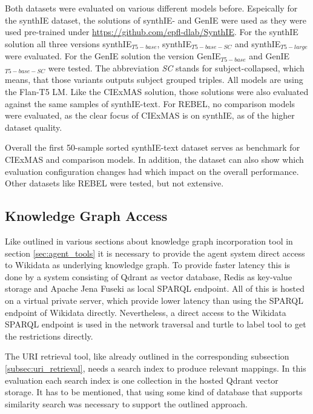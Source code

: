 \documentclass[a4paper,oneside,bibliography=totoc]{scrbook}
\begin{document}
Both datasets were evaluated on various different models before. Espeically for the synthIE dataset, the solutions of \citet{Josifoski2023} synthIE- and GenIE were used as they were used pre-trained under \url{https://github.com/epfl-dlab/SynthIE}. For the synthIE solution all three versions synthIE$_{T5-base}$, synthIE$_{T5-base-SC}$ and synthIE$_{T5-large}$ were evaluated. For the GenIE solution the version GenIE$_{T5-base}$ and GenIE$_{T5-base-SC}$ were tested. The abbreviation \textit{SC} stands for subject-collapsed, which means, that those variants outputs subject grouped triples. All models are using the Flan-T5 \ac{LM}. Like the CIExMAS solution, those solutions were also evaluated against the same samples of synthIE-text. For REBEL, no comparison models were evaluated, as the clear focus of CIExMAS is on synthIE, as of the higher dataset quality.

Overall the first 50-sample sorted synthIE-text dataset serves as benchmark for CIExMAS and comparison models. In addition, the dataset can also show which evaluation configuration changes had which impact on the overall performance. Other datasets like REBEL were tested, but not extensive.

\subsection{Knowledge Graph Access}

Like outlined in various sections about knowledge graph incorporation tool in section \ref{sec:agent_tools} it is necessary to provide the agent system direct access to Wikidata as underlying knowledge graph. To provide faster latency this is done by a system consisting of Qdrant as vector database, Redis as key-value storage and Apache Jena Fuseki as local SPARQL endpoint. All of this is hosted on a virtual private server, which provide lower latency than using the SPARQL endpoint of Wikidata directly. Nevertheless, a direct access to the Wikidata SPARQL endpoint is used in the network traversal and turtle to label tool to get the restrictions directly.

The URI retrieval tool, like already outlined in the corresponding subsection \ref{subsec:uri_retrieval}, needs a search index to produce relevant mappings. In this evaluation each search index is one collection in the hosted Qdrant vector storage. It has to be mentioned, that using some kind of database that supports similarity search was necessary to support the outlined approach.
\end{document}
